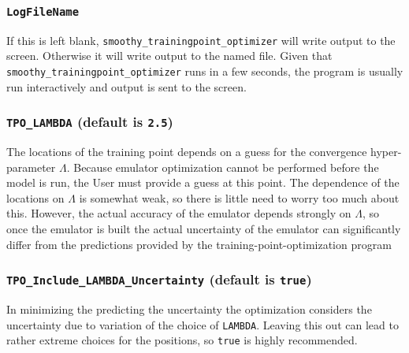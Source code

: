 \documentclass[UserManual.tex]{subfiles}
\begin{document}
\begin{sloppypar}
\subsubsection{{\tt LogFileName}}
If this is left blank, {\tt smoothy\_trainingpoint\_optimizer} will write output to the screen. Otherwise it will write output to the named file. Given that {\tt smoothy\_trainingpoint\_optimizer} runs in a few seconds, the program is usually run interactively and output is sent to the screen.
\subsubsection{{\tt TPO\_LAMBDA} (default is {\tt 2.5})}
The locations of the training point depends on a guess for the convergence hyper-parameter $\Lambda$. Because emulator optimization cannot be performed before the model is run, the User must provide a guess at this point. The dependence of the locations on $\Lambda$ is somewhat weak, so there is little need to worry too much about this. However, the actual accuracy of the emulator depends strongly on $\Lambda$, so once the emulator is built the actual uncertainty of the emulator can significantly differ from the predictions provided by the training-point-optimization program
\subsubsection{{\tt TPO\_Include\_LAMBDA\_Uncertainty} (default is {\tt true})}
In minimizing the predicting the uncertainty the optimization considers the uncertainty due to variation of the choice of {\tt LAMBDA}. Leaving this out can lead to rather extreme choices for the positions, so {\tt true} is highly recommended.

\end{sloppypar}
\end{document}

